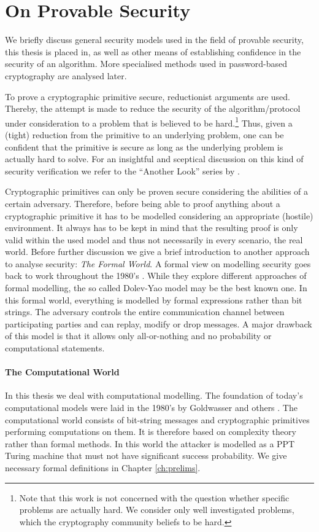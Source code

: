 \section{On Provable Security}\label{sec:intro:provable-security}
We briefly discuss general security models used in the field of provable security, this thesis is placed in, as well as other means of establishing confidence in the security of an algorithm.
More specialised methods used in password-based cryptography are analysed later.

To prove a cryptographic primitive secure, reductionist arguments are used.
Thereby, the attempt is made to reduce the security of the algorithm/protocol under consideration to a problem that is believed to be hard.\footnote{Note that this work is not concerned with the question whether specific problems are actually hard. We consider only well investigated problems, which the cryptography community beliefs to be hard.}
Thus, given a (tight) reduction from the primitive to an underlying problem, one can be confident that the primitive is secure as long as the underlying problem is actually hard to solve.
For an insightful and sceptical discussion on this kind of security verification we refer to the ``Another Look'' series by \citet{AnotherLook}.

Cryptographic primitives can only be proven secure considering the abilities of a certain adversary.
Therefore, before being able to proof anything about a cryptographic primitive it has to be modelled considering an appropriate (hostile) environment.
It always has to be kept in mind that the resulting proof is only valid within the used model and thus not necessarily in every scenario, \ie the real world.
Before further discussion we give a brief introduction to another approach to analyse security: \emph{The Formal World}.
A formal view on modelling security goes back to work throughout the 1980's \cite{DeMillo82,Dolev83,Millen87,Meadows91,Kemmerer1988,Burrows90}.
While they explore different approaches of formal modelling, the so called Dolev-Yao model \cite{Dolev83} may be the best known one.
In this formal world, everything is modelled by formal expressions rather than bit strings.
The adversary controls the entire communication channel between participating parties and can replay, modify or drop messages.
A major drawback of this model is that it allows only all-or-nothing  and no probability or computational statements.

\paragraph{The Computational World}
In this thesis we deal with computational modelling.
The foundation of today's computational models were laid in the 1980's by Goldwasser and others \cite{Goldwasser82,Goldwasser84,Yao82,Blum82}.
The computational world consists of bit-string messages and cryptographic primitives performing computations on them.
It is therefore based on complexity theory rather than formal methods.
In this world the attacker is modelled as a \ac{PPT} Turing machine \cite{Turing37} that must not have significant success probability.
We give necessary formal definitions in Chapter \ref{ch:prelims}.

